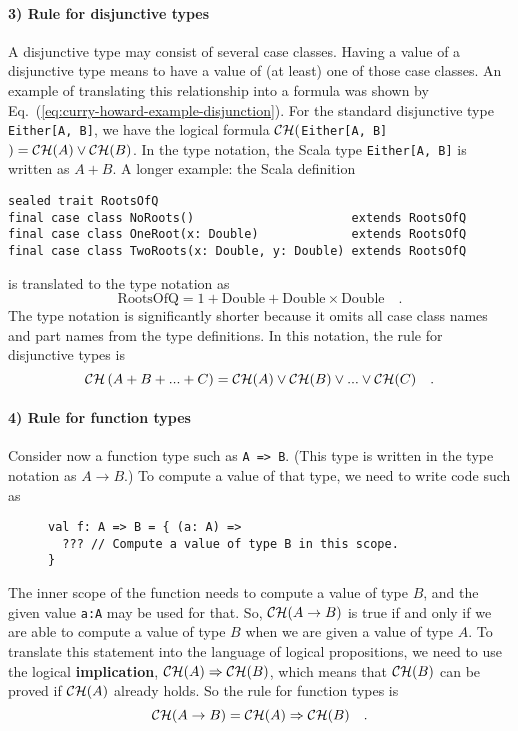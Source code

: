 \paragraph{3) Rule for disjunctive types}

A disjunctive type may consist of several case classes. Having a value
of a disjunctive type means to have a value of (at least) one of those
case classes. An example of translating this relationship into a formula
was shown by Eq.~(\ref{eq:curry-howard-example-disjunction}). For
the standard disjunctive type \lstinline!Either[A, B]!, we have the
logical formula ${\cal CH}($\lstinline!Either[A, B]!$)={\cal CH}(A)\vee{\cal CH}(B)$.
In the type notation, the Scala type \lstinline!Either[A, B]! is
written as $A+B$. A longer example: the Scala definition
\begin{lstlisting}
sealed trait RootsOfQ
final case class NoRoots()                      extends RootsOfQ
final case class OneRoot(x: Double)             extends RootsOfQ
final case class TwoRoots(x: Double, y: Double) extends RootsOfQ
\end{lstlisting}
is translated to the type notation as
\[
\text{RootsOfQ}=1+\text{Double}+\text{Double}\times\text{Double}\quad.
\]
The type notation is significantly shorter because it omits all case
class names and part names from the type definitions. In this notation,
the rule for disjunctive types is
\[
{\cal CH}\left(A+B+...+C\right)={\cal CH}(A)\vee{\cal CH}(B)\vee...\vee{\cal CH}(C)\quad.
\]


\paragraph{4) Rule for function types}

Consider now a function type such as \lstinline!A => B!. (This type
is written in the type notation as $A\rightarrow B$.) To compute
a value of that type, we need to write code such as

\begin{wrapfigure}{l}{0.5\columnwidth}%
\vspace{-0.65\baselineskip}
\begin{lstlisting}
val f: A => B = { (a: A) =>
  ??? // Compute a value of type B in this scope.
}
\end{lstlisting}

\vspace{-0.9\baselineskip}
\end{wrapfigure}%

\noindent The inner scope of the function needs to compute a value
of type $B$, and the given value \lstinline!a:A! may be used for
that. So, ${\cal CH}(A\rightarrow B)$ is true if and only if we are
able to compute a value of type $B$ when we are given a value of
type $A$. To translate this statement into the language of logical
propositions, we need to use the logical
\textbf{implication}, ${\cal CH}(A)\Rightarrow{\cal CH}(B)$, which
means that ${\cal CH}(B)$ can be proved if ${\cal CH}(A)$ already
holds. So the rule for function types is
\[
{\cal CH}(A\rightarrow B)={\cal CH}(A)\Rightarrow{\cal CH}(B)\quad.
\]


